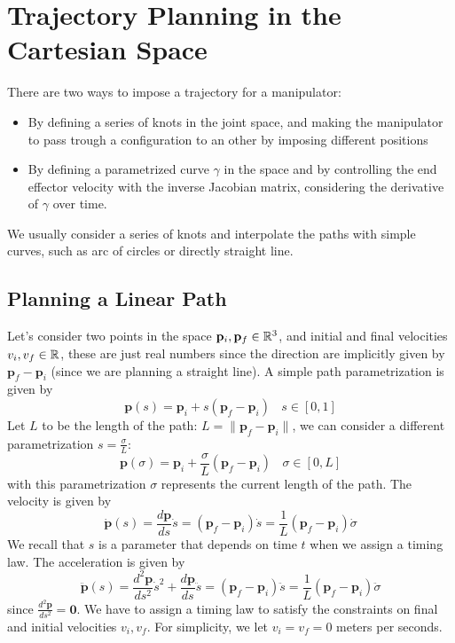 \documentclass[10pt, letterpaper]{report}
\begin{document}
\section{Trajectory Planning in the Cartesian Space}
There are two ways to impose a trajectory for a manipulator:\begin{itemize}
    \item By defining a series of knots in the joint space, and making the manipulator to pass trough a configuration to an other by imposing different positions
    \item By defining a parametrized curve $\gamma$ in the space and by controlling the end effector velocity with the inverse Jacobian matrix, considering the derivative of $\gamma$ over time.
\end{itemize}
We usually consider a series of knots and interpolate the paths with simple curves, such as arc of circles or directly straight line. 

\subsection{Planning a Linear Path}
Let's consider two points in the space $\mathbf p_i,\mathbf p_f\in {\mathbb R}^3$, and initial and final velocities $v_{i},v_f\in {\mathbb R}$, these are just real numbers since the direction are implicitly given by $\mathbf p_f-\mathbf p_i$ (since we are planning a straight line). A simple path parametrization is given by\begin{equation}
    \mathbf p(s)=\mathbf p_i+s(\mathbf p_f-\mathbf p_i) \ \ \ \ s\in [0,1]
\end{equation}
Let $L$ to be the length of the path: $L=\|\mathbf p_f-\mathbf p_i\|$, we can consider a different parametrization $s=\frac{\sigma}{L}$:\begin{equation}
      \mathbf p(\sigma)=\mathbf p_i+\frac{\sigma}{L}(\mathbf p_f-\mathbf p_i) \ \ \ \ \sigma\in [0,L]
\end{equation}
with this parametrization $\sigma$ represents the current length of the path. The velocity is given by\begin{equation}
    \dot{\mathbf p}(s)=\frac{d\mathbf p}{ds}\dot s=(\mathbf p_f-\mathbf p_i)\dot s=\frac{1}{L}(\mathbf p_f-\mathbf p_i)\dot \sigma
\end{equation} 
We recall that $s$ is a parameter that depends on time $t$ when we assign a timing law. The acceleration is given by\begin{equation}
    \ddot{\mathbf p}(s)=\frac{d^2\mathbf p}{ds^2}\dot s^2+\frac{d\mathbf p}{ds}\ddot s=(\mathbf p_f-\mathbf p_i)\ddot s=\frac{1}{L}(\mathbf p_f-\mathbf p_i)\ddot \sigma
\end{equation}
since $\frac{d^2\mathbf p}{ds^2}=\mathbf 0$.
We have to assign a timing law to satisfy the constraints on final and initial velocities $v_i,v_f$. For simplicity, we let $v_i=v_f=0$ meters per seconds.\bigskip
\end{document}
